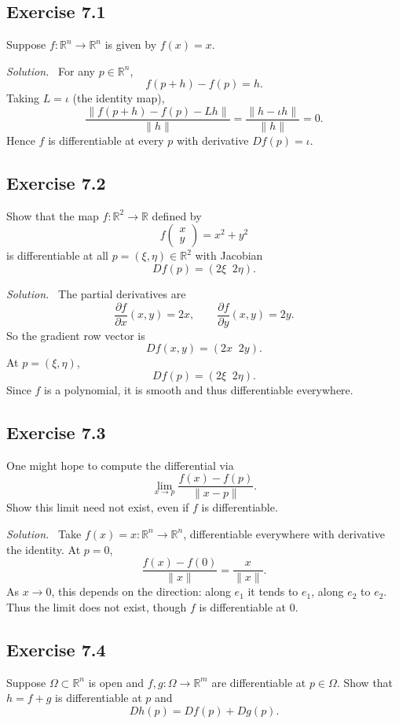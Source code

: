 \documentclass[11pt,a4paper]{article}
\newenvironment{solution}{\par\noindent\textit{Solution.}\ }{\par\vspace{0.5em}}
\begin{document}
\subsection*{Exercise 7.1}
Suppose $f:\mathbb{R}^n\to\mathbb{R}^n$ is given by $f(x)=x$. 

\begin{solution}
	For any $p\in\mathbb{R}^n$, 
	\[
	f(p+h)-f(p)=h.
	\]
	Taking $L=\iota$ (the identity map), 
	\[
	\frac{\|f(p+h)-f(p)-Lh\|}{\|h\|} = \frac{\|h-\iota h\|}{\|h\|}=0.
	\]
	Hence $f$ is differentiable at every $p$ with derivative $Df(p)=\iota$.
\end{solution}


\subsection*{Exercise 7.2}
Show that the map $f:\mathbb{R}^2\to\mathbb{R}$ defined by
\[
f\!\begin{pmatrix}x\\y\end{pmatrix}=x^2+y^2
\]
is differentiable at all $p=(\xi,\eta)\in\mathbb{R}^2$ with Jacobian
\[
Df(p)=(2\xi\;\;2\eta).
\]

\begin{solution}
	The partial derivatives are
	\[
	\frac{\partial f}{\partial x}(x,y)=2x,\qquad \frac{\partial f}{\partial y}(x,y)=2y.
	\]
	So the gradient row vector is
	\[
	Df(x,y)=(2x\;\;2y).
	\]
	At $p=(\xi,\eta)$,
	\[
	Df(p)=(2\xi\;\;2\eta).
	\]
	Since $f$ is a polynomial, it is smooth and thus differentiable everywhere.
\end{solution}

\subsection*{Exercise 7.3}
One might hope to compute the differential via
\[
\lim_{x\to p}\frac{f(x)-f(p)}{\|x-p\|}.
\]
Show this limit need not exist, even if $f$ is differentiable.

\begin{solution}
	Take $f(x)=x:\mathbb{R}^n\to\mathbb{R}^n$, differentiable everywhere with derivative the identity.
	At $p=0$,
	\[
	\frac{f(x)-f(0)}{\|x\|}=\frac{x}{\|x\|}.
	\]
	As $x\to 0$, this depends on the direction: along $e_1$ it tends to $e_1$, along $e_2$ to $e_2$.
	Thus the limit does not exist, though $f$ is differentiable at $0$.
\end{solution}


\subsection*{Exercise 7.4}
Suppose $\Omega\subset\mathbb{R}^n$ is open and $f,g:\Omega\to\mathbb{R}^m$ are differentiable at $p\in\Omega$.
Show that $h=f+g$ is differentiable at $p$ and
\[
Dh(p)=Df(p)+Dg(p).
\]
\end{document}

